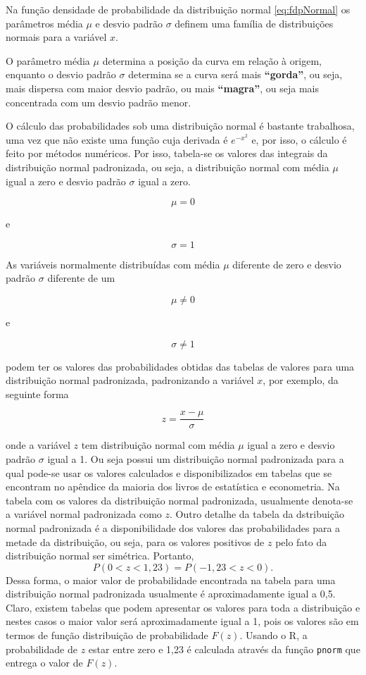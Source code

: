 \documentclass[
]{book}
\begin{document}
Na função densidade de probabilidade da distribuição normal \eqref{eq:fdpNormal} os parâmetros média \(\mu\) e desvio padrão \(\sigma\) definem uma família de distribuições normais para a variável \(x\).

O parâmetro média \(\mu\) determina a posição da curva em relação à origem, enquanto o desvio padrão \(\sigma\) determina se a curva será mais \textbf{``gorda''}, ou seja, mais dispersa com maior desvio padrão, ou mais \textbf{``magra''}, ou seja mais concentrada com um desvio padrão menor.

O cálculo das probabilidades sob uma distribuição normal é bastante trabalhosa, uma vez que não existe uma função cuja derivada é \(e^{-x^2}\) e, por isso, o cálculo é feito por métodos numéricos. Por isso, tabela-se os valores das integrais da distribuição normal padronizada, ou seja, a distribuição normal com média \(\mu\) igual a zero e desvio padrão \(\sigma\) igual a zero.

\[
  \mu = 0
\]

e

\[
  \sigma = 1
\]

As variáveis normalmente distribuídas com média \(\mu\) diferente de zero e desvio padrão \(\sigma\) diferente de um

\[
  \mu \neq 0
\]

e

\[
  \sigma \neq 1
\]

podem ter os valores das probabilidades obtidas das tabelas de valores para uma distribuição normal padronizada, padronizando a variável \(x\), por exemplo, da seguinte forma

\[
  z = \dfrac{x - \mu}{\sigma}
\]

onde a variável \(z\) tem distribuição normal com média \(\mu\) igual a zero e desvio padrão \(\sigma\) igual a 1. Ou seja possui um distribuição normal padronizada para a qual pode-se usar os valores calculados e disponibilizados em tabelas que se encontram no apêndice da maioria dos livros de estatística e econometria. Na tabela com os valores da distribuição normal padronizada, usualmente denota-se a variável normal padronizada como \(z\). Outro detalhe da tabela da dstribuição normal padronizada é a disponibilidade dos valores das probabilidades para a metade da distribuição, ou seja, para os valores positivos de \(z\) pelo fato da distribuição normal ser simétrica. Portanto,
\[
  P(0 < z < 1,23) = P(-1,23 < z < 0).
\]
Dessa forma, o maior valor de probabilidade encontrada na tabela para uma distribuição normal padronizada usualmente é aproximadamente igual a 0,5. Claro, existem tabelas que podem apresentar os valores para toda a distribuição e nestes casos o maior valor será aproximadamente igual a 1, pois os valores são em termos de função distribuição de probabilidade \(F(z)\).
Usando o R, a probabilidade de \(z\) estar entre zero e 1,23 é calculada através da função \texttt{pnorm} que entrega o valor de \(F(z)\).
\end{document}
